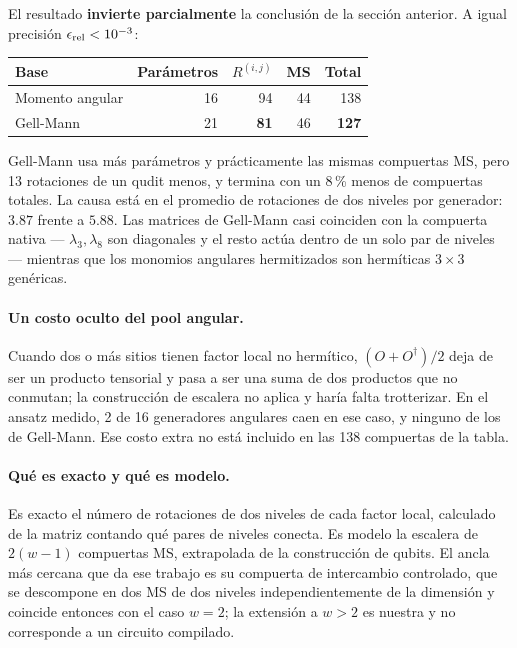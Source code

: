 \documentclass[11pt,a4paper]{article}
\begin{document}
El resultado \textbf{invierte parcialmente} la conclusión de la sección
anterior. A igual precisión $\epsilon_{\rm rel}<10^{-3}$:

\begin{center}
\begin{tabular}{lrrrr}
\toprule
Base & Parámetros & $R^{(i,j)}$ & MS & Total \\
\midrule
Momento angular & 16 & 94 & 44 & 138 \\
Gell-Mann & 21 & \textbf{81} & 46 & \textbf{127} \\
\bottomrule
\end{tabular}
\end{center}

Gell-Mann usa más parámetros y prácticamente las mismas compuertas MS, pero 13
rotaciones de un qudit menos, y termina con un 8\,\% menos de compuertas
totales. La causa está en el promedio de rotaciones de dos niveles por
generador: $3.87$ frente a $5.88$. Las matrices de Gell-Mann casi coinciden con
la compuerta nativa --- $\lambda_3,\lambda_8$ son diagonales y el resto actúa
dentro de un solo par de niveles --- mientras que los monomios angulares
hermitizados son hermíticas $3\times3$ genéricas.

\paragraph{Un costo oculto del pool angular.} Cuando dos o más sitios tienen
factor local no hermítico, $(O+O^\dagger)/2$ deja de ser un producto tensorial
y pasa a ser una suma de dos productos que no conmutan; la construcción de
escalera no aplica y haría falta trotterizar. En el ansatz medido, 2 de 16
generadores angulares caen en ese caso, y ninguno de los de Gell-Mann. Ese
costo extra no está incluido en las 138 compuertas de la tabla.

\paragraph{Qué es exacto y qué es modelo.} Es exacto el número de rotaciones de
dos niveles de cada factor local, calculado de la matriz contando qué pares de
niveles conecta. Es modelo la escalera de $2(w-1)$ compuertas MS, extrapolada
de la construcción de qubits. El ancla más cercana que da ese trabajo es su
compuerta de intercambio controlado, que se descompone en dos MS de dos
niveles independientemente de la dimensión y coincide entonces con el caso
$w=2$; la extensión a $w>2$ es nuestra y no corresponde a un circuito
compilado.
\end{document}
